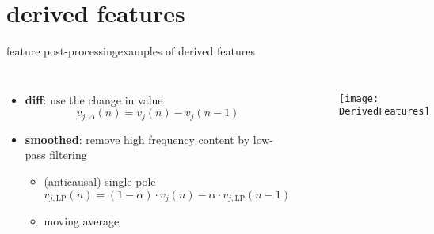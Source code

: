     \section[derived]{derived features}
		\begin{frame}{feature post-processing}{examples of derived features}
            \begin{columns}
                \begin{itemize}
                    \item   \textbf{diff}: use the change in value
                        \begin{equation*}
                            v_{j,\Delta}(n) = v_j(n) - v_j(n-1) 
                        \end{equation*}
                    \smallskip
                    \item<2-> \textbf{smoothed}: remove high frequency content by low-pass filtering
                        \begin{itemize}
                            \item	 (anticausal) single-pole
                                \begin{equation*}
                                    v_{j,\mathrm{LP}}(n) = (1-\alpha)\cdot v_j(n) - \alpha\cdot v_{j,\mathrm{LP}}(n-1) 
                                \end{equation*}
                            \item	moving average
                        \end{itemize}
                \end{itemize}
                
                \vspace{-10mm}
                \begin{figure}%
                    \texttt{[image: DerivedFeatures]}%
                \end{figure}
            \end{columns}
		\end{frame}

